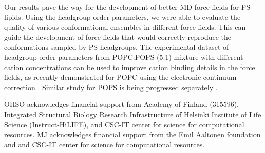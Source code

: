 \documentclass[aps,prl,superscriptaddress,twocolumn]{revtex4}
\begin{document}
Our results pave the way for the development of better MD force fields
for PS lipids. Using the headgroup order parameters, we were able to evaluate the
quality of various conformational ensembles in different force fields.
This can guide the development of force fields that would correctly reproduce the
conformations sampled by PS headgroups. The experimental dataset of headgroup order
parameters from POPC:POPS (5:1) mixture with different cation concentrations can
be used to improve cation binding details in the force fields, as recently demonstrated
for POPC using the electronic continuum correction \cite{melcr18}.
Similar study for POPS is being progressed separately \cite{ECCpops}.

%

\begin{acknowledgments}
  OHSO acknowledges financial support from Academy of Finland (315596),
  Integrated Structural Biology Research Infrastructure of
  Helsinki Institute of Life Science (Instruct-HiLIFE), and
  CSC-IT center for science for computational resources.
  MJ acknowledges financial support from the Emil Aaltonen foundation and
  and CSC-IT center for science for computational resources.
\end{acknowledgments}

\newpage





\listoftodos
\end{document}
